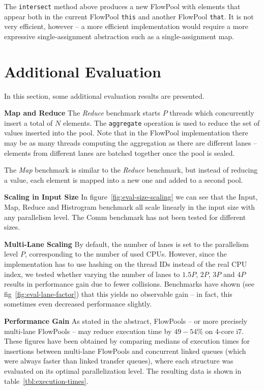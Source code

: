 \documentclass[runningheads,a4paper]{llncs}
\begin{document}
The \verb=intersect= method above produces a new FlowPool with
elements that appear both in the current FlowPool \verb=this=
and another FlowPool \verb=that=.
It is not very efficient, however -- a more efficient implementation
would require a more expressive single-assignment abstraction such
as a single-assignment map.





\section{Additional Evaluation}
\label{sec:add-eval}
In this section, some additional evaluation results are presented.

\textbf{Map and Reduce} The \textit{Reduce} benchmark starts $P$
threads which concurrently insert a total of $N$ elements. The
\verb=aggregate= operation is used to reduce the set of values
inserted into the pool. Note that in the FlowPool implementation there
may be as many threads computing the aggregation as there are
different lanes -- elements from different lanes are batched together
once the pool is sealed.

The \textit{Map} benchmark is similar to the \textit{Reduce}
benchmark, but instead of reducing a value, each element is mapped
into a new one and added to a second pool.

\textbf{Scaling in Input Size} In figure~\ref{fig:eval-size-scaling}
we can see that the Input, Map, Reduce and Histrogram benchmark all
scale linearly in the input size with any parallelism level. The Comm
benchmark has not been tested for different sizes. 

\textbf{Multi-Lane Scaling} By default, the number of lanes is set to
the parallelism level $P$, corresponding to the number of used
CPUs. However, since the implementation has to use hashing on the
thread IDs instead of the real CPU index, we tested whether varying
the number of lanes to $1.5 P$, $2P$, $3P$ and $4P$ results in
performance gain due to fewer collisions. Benchmarks have shown (see
fig~\ref{fig:eval-lane-factor}) that this yields no observable gain --
in fact, this sometimes even decreased performance slightly.

\textbf{Performance Gain} As stated in the abstract, FlowPools -- or
more precisely multi-lane FlowPools -- may reduce execution time by
$49 - 54\%$ on 4-core i7. These figures have been obtained by
comparing medians of execution times for insertions between multi-lane
FlowPools and concurrent linked queues (which were always faster than 
linked transfer queues), where each structure was evaluated on its
optimal parallelization level. The resulting data is shown in
table~\ref{tbl:execution-times}.
\end{document}

